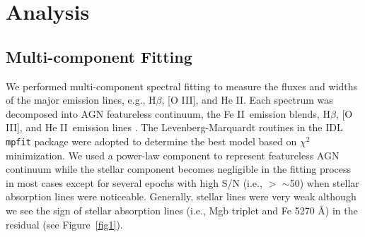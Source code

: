 \documentclass[iop]{emulateapj}
\newcommand{\Hb}{\rm H{$\beta$}}
\newcommand{\OIII}{[O {\small III}]}
\newcommand{\FeII}{Fe {\small II}}
\newcommand{\HeII}{He {\small II}}
\begin{document}
\section{Analysis}

\subsection{Multi-component Fitting}
We performed multi-component spectral fitting to measure the fluxes and widths of the major emission lines, e.g., \Hb, \OIII, and \HeII.
Each spectrum was decomposed into AGN featureless continuum, the \FeII\ emission blends, \Hb,  \OIII, and \HeII\ emission lines \citep[see][]{Woo2006, Park2012}. The Levenberg-Marquardt routines in the IDL \texttt{mpfit} package \citep{Markwardt2009} were adopted to determine the best model based on $\chi^2$ minimization. We used a power-law component to represent featureless AGN continuum while the stellar component becomes negligible in the fitting process in most cases except for several epochs with high S/N (i.e., $>$ $\sim$50) when stellar absorption lines were noticeable. Generally, stellar lines were very weak although we see the sign of stellar absorption lines (i.e., Mgb triplet and Fe 5270 \AA) in the residual (see Figure~\ref{fig1}).
\end{document}
